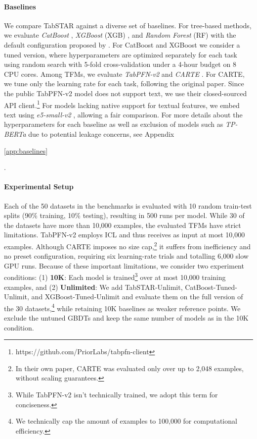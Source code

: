 \documentclass{article}
\newif\ifappendicesincluded
\newcommand{\appref}[1]{%
  \ifappendicesincluded
    \ref{#1}%
  \else
    \ref*{#1}%
  \fi
}
\begin{document}
\paragraph{Baselines}\label{sec:exp:baselines}
We compare TabSTAR against a diverse set of baselines. For tree-based methods, we evaluate \textit{CatBoost} \cite{prokhorenkova_catboost_2018}, \textit{XGBoost} (XGB) \cite{chen_xgboost_2016}, and \textit{Random Forest} (RF) \cite{breiman_random_2001} with the default configuration proposed by \cite{gorishniy_revisiting_2021}. For CatBoost and XGBoost we consider a tuned version, where hyperparameters are optimized separately for each task using random search with 5-fold cross-validation under a 4-hour budget on 8 CPU cores. Among TFMs, we evaluate \textit{TabPFN-v2} \cite{hollmann_accurate_2025} and \textit{CARTE} \cite{kim_carte_2024}. For CARTE, we tune only the learning rate for each task, following the original paper. Since the public TabPFN-v2 model does not support text, we use their closed-sourced API client.\footnote{https://github.com/PriorLabs/tabpfn-client} For models lacking native support for textual features, we embed text using \textit{e5-small-v2} \cite{wang_text_2024}, allowing a fair comparison. For more details about the hyperparameters for each baseline as well as exclusion of models such as \textit{TP-BERTa} due to potential leakage concerns, see Appendix~\appref{app:baselines}.

\paragraph{Experimental Setup}\label{sec:exp:setup} Each of the 50 datasets in the benchmarks is evaluated with 10 random train-test splits (90\% training, 10\% testing), resulting in 500 runs per model. While 30 of the datasets have more than 10,000 examples, the evaluated TFMs have strict limitations. TabPFN-v2 employs ICL and thus receives as input at most 10,000 examples. Although CARTE imposes no size cap,\footnote{In their own paper, CARTE was evaluated only over up to 2,048 examples, without scaling guarantees.} it suffers from inefficiency and no preset configuration, requiring six learning-rate trials and totalling 6,000 slow GPU runs. Because of these important limitations, we consider two experiment conditions: (1) \textbf{10K}: Each model is trained\footnote{While TabPFN-v2 isn't technically trained, we adopt this term for conciseness.} over at most 10,000 training examples, and (2) \textbf{Unlimited}: We add TabSTAR-Unlimit, CatBoost-Tuned-Unlimit, and XGBoost-Tuned-Unlimit and evaluate them on the full version of the 30 datasets,\footnote{We technically cap the amount of examples to 100,000 for computational efficiency.} while retaining 10K baselines as weaker reference points. We exclude the untuned GBDTs and keep the same number of models as in the 10K condition.
\end{document}
